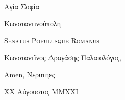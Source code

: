 \documentclass[a4paper,12pt]{article}
\newcommand{\recipientaddress}{
    \begingroup
            \sffamily
            \mdseries
            \footnotesize
            \setlength{\baselineskip}{14pt}
            \setlength{\parskip}{0pt}

            Αγία Σοφία
            
            Κωνσταντινούπολη
            
            \scshape 
            Senatus Populusque Romanus

    \endgroup
}
\begin{document}
    \pagestyle{plain}
    \rmfamily\normalsize
    \setlength{\parskip}{13pt}
    \setlength{\baselineskip}{17pt}
    \RaggedRight

    \recipientaddress\vspace{10mm}

    \normalsize

    Κωνσταντῖνος Δραγάσης Παλαιολόγος,

    \lipsum[1]

    \lipsum[2]

    Amen,\linebreak
    Νερυτηες

    {\footnotesize XX Αύγουστος MMXXI}
\end{document}
